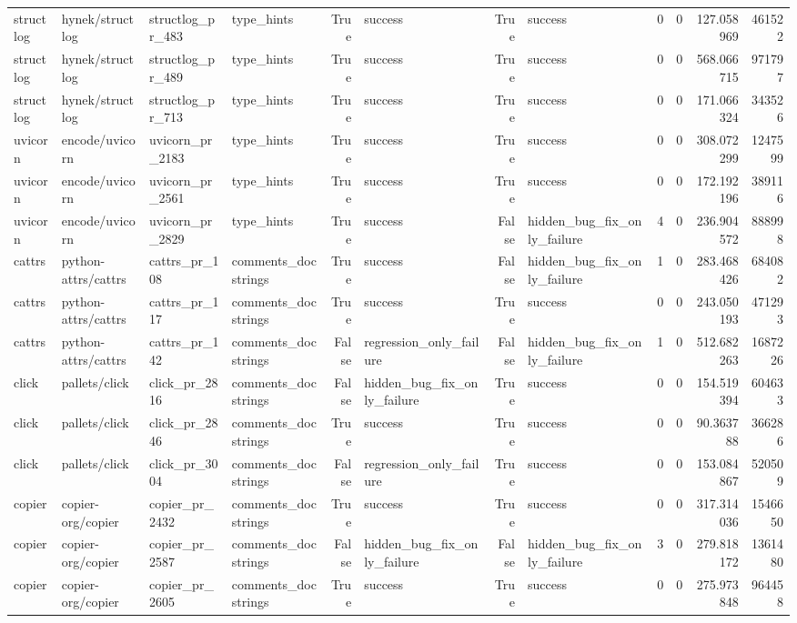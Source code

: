 \begin{tabular}{llllrlrlrrrr}
structlog & hynek/structlog & structlog\_pr\_483 & type\_hints & True & success & True & success & 0 & 0 & 127.058969 & 461522 \\
structlog & hynek/structlog & structlog\_pr\_489 & type\_hints & True & success & True & success & 0 & 0 & 568.066715 & 971797 \\
structlog & hynek/structlog & structlog\_pr\_713 & type\_hints & True & success & True & success & 0 & 0 & 171.066324 & 343526 \\
uvicorn & encode/uvicorn & uvicorn\_pr\_2183 & type\_hints & True & success & True & success & 0 & 0 & 308.072299 & 1247599 \\
uvicorn & encode/uvicorn & uvicorn\_pr\_2561 & type\_hints & True & success & True & success & 0 & 0 & 172.192196 & 389116 \\
uvicorn & encode/uvicorn & uvicorn\_pr\_2829 & type\_hints & True & success & False & hidden\_bug\_fix\_only\_failure & 4 & 0 & 236.904572 & 888998 \\
cattrs & python-attrs/cattrs & cattrs\_pr\_108 & comments\_docstrings & True & success & False & hidden\_bug\_fix\_only\_failure & 1 & 0 & 283.468426 & 684082 \\
cattrs & python-attrs/cattrs & cattrs\_pr\_117 & comments\_docstrings & True & success & True & success & 0 & 0 & 243.050193 & 471293 \\
cattrs & python-attrs/cattrs & cattrs\_pr\_142 & comments\_docstrings & False & regression\_only\_failure & False & hidden\_bug\_fix\_only\_failure & 1 & 0 & 512.682263 & 1687226 \\
click & pallets/click & click\_pr\_2816 & comments\_docstrings & False & hidden\_bug\_fix\_only\_failure & True & success & 0 & 0 & 154.519394 & 604633 \\
click & pallets/click & click\_pr\_2846 & comments\_docstrings & True & success & True & success & 0 & 0 & 90.363788 & 366286 \\
click & pallets/click & click\_pr\_3004 & comments\_docstrings & False & regression\_only\_failure & True & success & 0 & 0 & 153.084867 & 520509 \\
copier & copier-org/copier & copier\_pr\_2432 & comments\_docstrings & True & success & True & success & 0 & 0 & 317.314036 & 1546650 \\
copier & copier-org/copier & copier\_pr\_2587 & comments\_docstrings & False & hidden\_bug\_fix\_only\_failure & False & hidden\_bug\_fix\_only\_failure & 3 & 0 & 279.818172 & 1361480 \\
copier & copier-org/copier & copier\_pr\_2605 & comments\_docstrings & True & success & True & success & 0 & 0 & 275.973848 & 964458 \\

\end{tabular}
